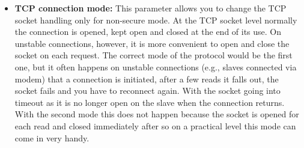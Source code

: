 \begin{itemize}
    \item \textbf{TCP connection mode:}
    This parameter allows you to change the TCP socket handling only for 
    non-secure mode. At the TCP socket level normally the connection is opened,
    kept open and closed at the end of its use.
    On unstable connections, however, it is more convenient to open and 
    close the socket on each request.
    The correct mode of the protocol would be the first one,
    but it often happens 
    on unstable connections (e.g., slaves connected via modem) that a connection is initiated,
    after a few reads it falls out, the socket fails and you have to reconnect again.
    With the socket going into timeout as it is no longer open on the slave 
    when the connection returns. With the second
    mode this does not happen because the socket is opened for each read 
    and closed immediately after so on a practical level this mode can come in very handy.
\end{itemize}